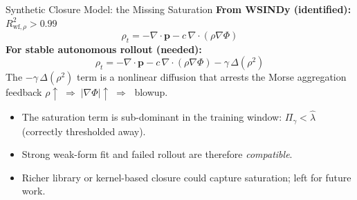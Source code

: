 \begin{frame}[noframenumbering,shrink=4]{Synthetic Closure Model: the Missing Saturation}
\normalsize
\textbf{From WSINDy (identified):}\quad $R^2_{\mathrm{wf},\rho} > 0.99$
\[
  \rho_t = -\nabla\!\cdot\mathbf{p} - c\,\nabla\!\cdot(\rho\nabla\Phi)
\]
\textbf{For stable autonomous rollout (needed):}
\[
  \rho_t = -\nabla\!\cdot\mathbf{p} - c\,\nabla\!\cdot(\rho\nabla\Phi) - \gamma\,\Delta(\rho^2)
\]
The $-\gamma\,\Delta(\rho^2)$ term is a nonlinear diffusion that arrests the Morse aggregation feedback
$\rho\uparrow\;\Rightarrow\;|\nabla\Phi|\uparrow\;\Rightarrow\;$ blowup.

\medskip
\begin{itemize}
  \item The saturation term is sub-dominant in the training window: $\Pi_\gamma < \hat\lambda$ (correctly thresholded away).
  \item Strong weak-form fit and failed rollout are therefore \emph{compatible}.
  \item Richer library or kernel-based closure could capture saturation; left for future work.
\end{itemize}
\end{frame}

